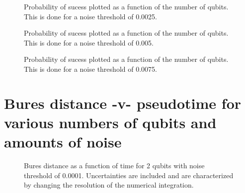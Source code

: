 \pagebreak

\begin{figure}[h]
\begin{center}
\end{center}
\caption{Probability of sucess plotted as a function of the number of qubits. This
is done for a noise threshold of 0.0025.}
\end{figure}

\pagebreak

\begin{figure}[h]
\begin{center}
\end{center}
\caption{Probability of sucess plotted as a function of the number of qubits. This
is done for a noise threshold of 0.005.}
\end{figure}

\pagebreak

\begin{figure}[h]
\begin{center}
\end{center}
\caption{Probability of sucess plotted as a function of the number of qubits. This
is done for a noise threshold of 0.0075.}
\end{figure}


\pagebreak

\vfill
\section{Bures distance -v- pseudotime for various numbers of qubits and
amounts of noise}
\vfill

\pagebreak



\begin{figure}[h]
\begin{center}
\end{center}
\caption{Bures distance as a function of time for 2 qubits with noise
threshold of 0.0001.  Uncertainties are included and are characterized 
by changing the resolution of the numerical integration.}
\end{figure}

